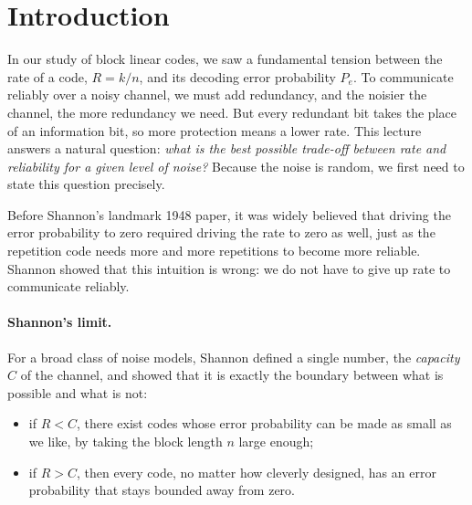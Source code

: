 
\Contributor{}

\lstset{style=mystyle}

\MakeScribeTop


\section{Introduction}
In our study of block linear codes, we saw a fundamental tension between the rate of a code, \(R = k/n\), and its decoding error probability \(P_e\). To communicate reliably over a noisy channel, we must add redundancy, and the noisier the channel, the more redundancy we need. But every redundant bit takes the place of an information bit, so more protection means a lower rate. This lecture answers a natural question: \emph{what is the best possible trade-off between rate and reliability for a given level of noise?} Because the noise is random, we first need to state this question precisely.

Before Shannon's landmark 1948 paper, it was widely believed that driving the error probability to zero required driving the rate to zero as well, just as the repetition code needs more and more repetitions to become more reliable. Shannon showed that this intuition is wrong: we do not have to give up rate to communicate reliably.

\paragraph{Shannon's limit.} For a broad class of noise models, Shannon defined a single number, the \emph{capacity} \(C\) of the channel, and showed that it is exactly the boundary between what is possible and what is not:
\begin{itemize}
    \item if \(R < C\), there exist codes whose error probability can be made as small as we like, by taking the block length \(n\) large enough;
    \item if \(R > C\), then every code, no matter how cleverly designed, has an error probability that stays bounded away from zero.
\end{itemize}

